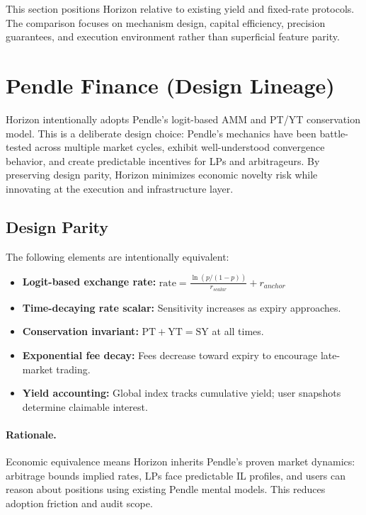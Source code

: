 
This section positions Horizon relative to existing yield and fixed-rate protocols. The comparison focuses on mechanism design, capital efficiency, precision guarantees, and execution environment rather than superficial feature parity.


\section{Pendle Finance (Design Lineage)}

Horizon intentionally adopts Pendle's logit-based AMM and PT/YT conservation model. This is a deliberate design choice: Pendle's mechanics have been battle-tested across multiple market cycles, exhibit well-understood convergence behavior, and create predictable incentives for LPs and arbitrageurs. By preserving design parity, Horizon minimizes economic novelty risk while innovating at the execution and infrastructure layer.

\subsection{Design Parity}

The following elements are intentionally equivalent:

\begin{itemize}
\item \textbf{Logit-based exchange rate:} $\text{rate} = \frac{\ln(p/(1-p))}{r_{scalar}} + r_{anchor}$
\item \textbf{Time-decaying rate scalar:} Sensitivity increases as expiry approaches.
\item \textbf{Conservation invariant:} $\text{PT} + \text{YT} = \text{SY}$ at all times.
\item \textbf{Exponential fee decay:} Fees decrease toward expiry to encourage late-market trading.
\item \textbf{Yield accounting:} Global index tracks cumulative yield; user snapshots determine claimable interest.
\end{itemize}

\paragraph{Rationale.}
Economic equivalence means Horizon inherits Pendle's proven market dynamics: arbitrage bounds implied rates, LPs face predictable IL profiles, and users can reason about positions using existing Pendle mental models. This reduces adoption friction and audit scope.

